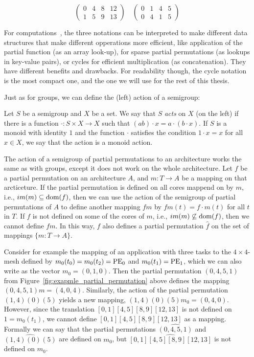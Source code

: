 \begin{equation*}
\left(
\begin{array}{llll}
0 & 4 & 8 & 12 \\
1 & 5 & 9 & 13 
\end{array}
\right)
\quad
\left(
\begin{array}{llll}
0 & 1 & 4 & 5 \\
0 & 4 & 1 & 5
\end{array}
\right)
\end{equation*}

For computations~\cite{east2019semigroups}, the three notations can be interpreted to make different data structures that make different opperations more efficient, like application of the partial function (as an array look-up), for sparse partial permutations (as lookups in key-value pairs), or cycles for efficient multiplication (as concatenation). They have different benefits and drawbacks. For readability though, the cycle notation is the most compact one, and the one we will use for the rest of this thesis.

Just as for groups, we can define the (left) action of a semigroup:
\begin{defn}
Let $S$ be a semigroup and $X$ be a set. We say that $S$ \emph{acts} on $X$ (on the left) if there is a function $\cdot : S \times X \rightarrow X$ such that $(ab) \cdot x = a \cdot (b \cdot x)$. If $S$ is a monoid with identity $1$ and the function $\cdot$ satisfies the condition $1 \cdot x = x$ for all $x \in X$, we say that the action is a monoid action.
\end{defn}

The action of a semigroup of partial permutations to an architecture works the same as with groups, except it does not work on the whole architecture.
Let $f$ be a partial permutation on an architecture $A$, and $m : T \rightarrow A$ be a mapping on that arcticeture.
If the partial permutation is defined on all cores mappend on by $m$, i.e., $im(m) \subseteq \operatorname{dom}(f)$, then we can use the action of the semigroup of partial permutations of $A$ to define another mapping $fm$ by $fm(t) = f \cdot m(t)$
for all $t$ in $T$. If $f$ is not defined on some of the cores of $m$, i.e., $im(m) \not \subseteq \operatorname{dom}(f)$, then we cannot define $fm$. In this way, $f$ also defines a partial permutation $\hat f$ on the set of mappings $\{ m : T \rightarrow A \}$.

Consider for example the mapping of an application with three tasks to the $4 \times 4$-mesh defined by $m_0(t_0) = m_0(t_2) = \operatorname{PE}_0$ and $m_0(t_1) = \operatorname{PE}_1$, which we can also write as the vector $m_0 = (0,1,0)$.
Then the partial permutation $(0,4,5,1)$ from Figure~\ref{fig:exapmle_partial_permutation} above defines the mapping $(0,4,5,1)m = (4,0,4)$.
Similarly, the action of the partial permutation $(1,4)(0)(5)$ yields a new mapping, $(1,4)(0)(5)m_0 = (0,4,0)$.
However, since the translation $[0,1][4,5][8,9][12,13]$ is not defined on $1 = m_0(t_1)$, we cannot define $[0,1][4,5][8,9][12,13]$ as a mapping.
Formally we can say that the partial permutations $\widehat{(0,4,5,1)}$ and $\widehat{(1,4)(0)(5)}$ are defined on $m_0$, but $\widehat{[0,1][4,5][8,9][12,13]}$ is not defined on $m_0$.

